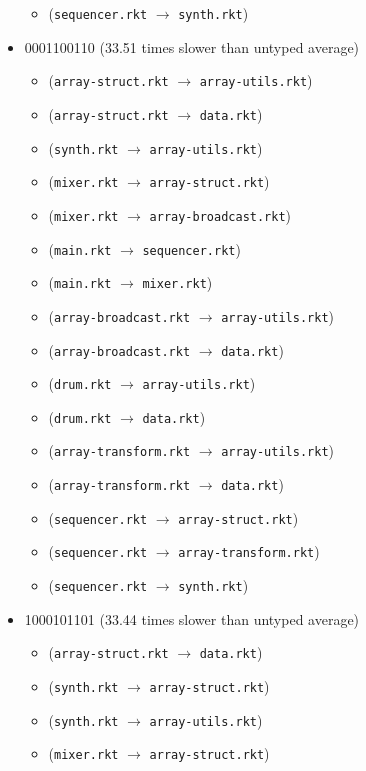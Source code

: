 \documentclass{article}
\newcommand{\mono}[1]{\texttt{#1}}
\begin{document}
\begin{itemize}
\begin{itemize}
  \item (\mono{sequencer.rkt} $\rightarrow$ \mono{synth.rkt})
  \end{itemize}
\item 0001100110 (33.51 times slower than untyped average)
  \begin{itemize}
  \item (\mono{array-struct.rkt} $\rightarrow$ \mono{array-utils.rkt})
  \item (\mono{array-struct.rkt} $\rightarrow$ \mono{data.rkt})
  \item (\mono{synth.rkt} $\rightarrow$ \mono{array-utils.rkt})
  \item (\mono{mixer.rkt} $\rightarrow$ \mono{array-struct.rkt})
  \item (\mono{mixer.rkt} $\rightarrow$ \mono{array-broadcast.rkt})
  \item (\mono{main.rkt} $\rightarrow$ \mono{sequencer.rkt})
  \item (\mono{main.rkt} $\rightarrow$ \mono{mixer.rkt})
  \item (\mono{array-broadcast.rkt} $\rightarrow$ \mono{array-utils.rkt})
  \item (\mono{array-broadcast.rkt} $\rightarrow$ \mono{data.rkt})
  \item (\mono{drum.rkt} $\rightarrow$ \mono{array-utils.rkt})
  \item (\mono{drum.rkt} $\rightarrow$ \mono{data.rkt})
  \item (\mono{array-transform.rkt} $\rightarrow$ \mono{array-utils.rkt})
  \item (\mono{array-transform.rkt} $\rightarrow$ \mono{data.rkt})
  \item (\mono{sequencer.rkt} $\rightarrow$ \mono{array-struct.rkt})
  \item (\mono{sequencer.rkt} $\rightarrow$ \mono{array-transform.rkt})
  \item (\mono{sequencer.rkt} $\rightarrow$ \mono{synth.rkt})
  \end{itemize}
\item 1000101101 (33.44 times slower than untyped average)
  \begin{itemize}
  \item (\mono{array-struct.rkt} $\rightarrow$ \mono{data.rkt})
  \item (\mono{synth.rkt} $\rightarrow$ \mono{array-struct.rkt})
  \item (\mono{synth.rkt} $\rightarrow$ \mono{array-utils.rkt})
  \item (\mono{mixer.rkt} $\rightarrow$ \mono{array-struct.rkt})

\end{itemize}
\end{itemize}
\end{document}
